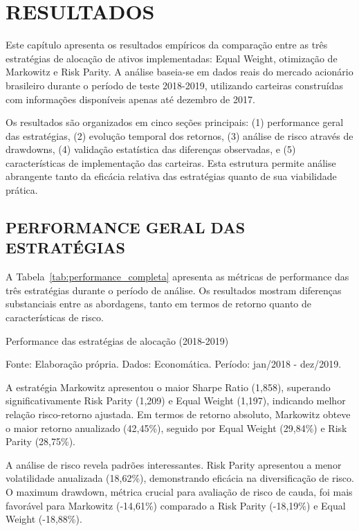 
\chapter{RESULTADOS}

Este capítulo apresenta os resultados empíricos da comparação entre as três estratégias de alocação de ativos implementadas: Equal Weight, otimização de Markowitz e Risk Parity. A análise baseia-se em dados reais do mercado acionário brasileiro durante o período de teste 2018-2019, utilizando carteiras construídas com informações disponíveis apenas até dezembro de 2017.

Os resultados são organizados em cinco seções principais: (1) performance geral das estratégias, (2) evolução temporal dos retornos, (3) análise de risco através de drawdowns, (4) validação estatística das diferenças observadas, e (5) características de implementação das carteiras. Esta estrutura permite análise abrangente tanto da eficácia relativa das estratégias quanto de sua viabilidade prática.

\section{PERFORMANCE GERAL DAS ESTRATÉGIAS}

A Tabela~\ref{tab:performance_completa} apresenta as métricas de performance das três estratégias durante o período de análise. Os resultados mostram diferenças substanciais entre as abordagens, tanto em termos de retorno quanto de características de risco.

\begin{table}[H]
\centering
\caption{Performance das estratégias de alocação (2018-2019)}
\label{tab:performance_completa}

\footnotesize
Fonte: Elaboração própria. Dados: Economática. Período: jan/2018 - dez/2019.
\end{table}

A estratégia Markowitz apresentou o maior Sharpe Ratio (1,858), superando significativamente Risk Parity (1,209) e Equal Weight (1,197), indicando melhor relação risco-retorno ajustada. Em termos de retorno absoluto, Markowitz obteve o maior retorno anualizado (42,45\%), seguido por Equal Weight (29,84\%) e Risk Parity (28,75\%).

A análise de risco revela padrões interessantes. Risk Parity apresentou a menor volatilidade anualizada (18,62\%), demonstrando eficácia na diversificação de risco. O maximum drawdown, métrica crucial para avaliação de risco de cauda, foi mais favorável para Markowitz (-14,61\%) comparado a Risk Parity (-18,19\%) e Equal Weight (-18,88\%).

